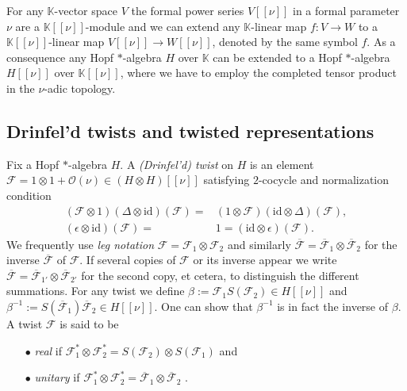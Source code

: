 \documentclass[a4paper,11pt]{article}
\begin{document}
For any $\mathbb{K}$-vector space $V$ the formal power series $V[[\nu]]$ in a formal
parameter $\nu$ are a $\mathbb{K}[[\nu]]$-module and we can extend any $\mathbb{K}$-linear
map $f\colon V\rightarrow W$ to a $\mathbb{K}[[\nu]]$-linear map
$V[[\nu]]\rightarrow W[[\nu]]$, denoted by the same symbol $f$. As a consequence
any Hopf $*$-algebra $H$ over $\mathbb{K}$ can be extended to a 
Hopf $*$-algebra $H[[\nu]]$ over $\mathbb{K}[[\nu]]$, where we have to employ the
completed tensor product in the $\nu$-adic topology.

\subsection{Drinfel'd twists and twisted representations}
\label{DrinfeldTwists}

Fix a Hopf $*$-algebra $H$. A \textit{(Drinfel'd) twist} on $H$ is an element
$\mathcal{F}=1\otimes 1+\mathcal{O}(\nu)\in(H\otimes H)[[\nu]]$ satisfying
$2$-cocycle and normalization condition
\begin{equation}
\begin{split}
    (\mathcal{F}\otimes 1)(\Delta\otimes\mathrm{id})(\mathcal{F})
    =&(1\otimes\mathcal{F})(\mathrm{id}\otimes\Delta)(\mathcal{F}),\\
    (\epsilon\otimes\mathrm{id})(\mathcal{F})
    =&1=(\mathrm{id}\otimes\epsilon)(\mathcal{F}).
\end{split}
\end{equation}
We frequently use \textit{leg notation} $\mathcal{F}=\mathcal{F}_1\otimes\mathcal{F}_2$
and similarly $\overline{\mathcal{F}}=
\overline{\mathcal{F}}_1\otimes\overline{\mathcal{F}}_2$ for the inverse
$\overline{\mathcal{F}}$ of $\mathcal{F}$. If several copies of $\mathcal{F}$ or its
inverse appear we write $\overline{\mathcal{F}}=\overline{\mathcal{F}}_{1'}\otimes
\overline{\mathcal{F}}_{2'}$ for the second copy, et cetera, to distinguish the different
summations. For any twist we define $\beta:=\mathcal{F}_1S(\mathcal{F}_2)\in H[[\nu]]$
and $\beta^{-1}:=S(\overline{\mathcal{F}}_1)\overline{\mathcal{F}}_2\in H[[\nu]]$.
One can show that $\beta^{-1}$ is in fact the inverse of $\beta$. A twist
$\mathcal{F}$ is said to be 
\begin{enumerate}
\item[$\bullet$] \textit{real} if $\mathcal{F}_1^*\otimes\mathcal{F}_2^*
=S(\mathcal{F}_2)\otimes S(\mathcal{F}_1)$ \cite{Aschieri2006}  and

\item[$\bullet$] \textit{unitary} if $\mathcal{F}_1^*\otimes\mathcal{F}_2^*
=\overline{\mathcal{F}}_1\otimes\overline{\mathcal{F}}_2$ \cite{Fiore2010} .
\end{enumerate}
\end{document}
